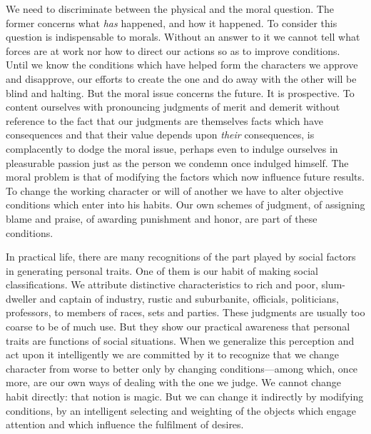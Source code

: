 \documentclass[12pt]{article}
\begin{document}
We need to discriminate between the physical and the
moral question. The former concerns what \emph{has} happened,
and how it happened. To consider this question
is indispensable to morals. Without an answer to it we
cannot tell what forces are at work nor how to direct
our actions so as to improve conditions. Until we
know the conditions which have helped form the characters
we approve and disapprove, our efforts to create
the one and do away with the other will be blind and
halting. But the moral issue concerns the future. It is
prospective. To content ourselves with pronouncing
judgments of merit and demerit without reference to
the fact that our judgments are themselves facts which
have consequences and that their value depends upon
\emph{their} consequences, is complacently to dodge the moral
issue, perhaps even to indulge ourselves in pleasurable
passion just as the person we condemn once indulged
himself. The moral problem is that of modifying the
factors which now influence future results. To change
the working character or will of another we have to
alter objective conditions which enter into his habits.
Our own schemes of judgment, of assigning blame and
praise, of awarding punishment and honor, are part
of these conditions.

In practical life, there are many recognitions of the
part played by social factors in generating personal
traits. One of them is our habit of making social
classifications. We attribute distinctive characteristics
to rich and poor, slum-dweller and captain of industry,
rustic and suburbanite, officials, politicians, professors,
to members of races, sets and parties. These judgments
are usually too coarse to be of much use. But
they show our practical awareness that personal traits
are functions of social situations. When we generalize
this perception and act upon it intelligently we are
committed by it to recognize that we change character
from worse to better only by changing conditions---among
which, once more, are our own ways of dealing
with the one we judge. We cannot change habit directly:
that notion is magic. But we can change it
indirectly by modifying conditions, by an intelligent
selecting and weighting of the objects which engage
attention and which influence the fulfilment of desires.
\end{document}
